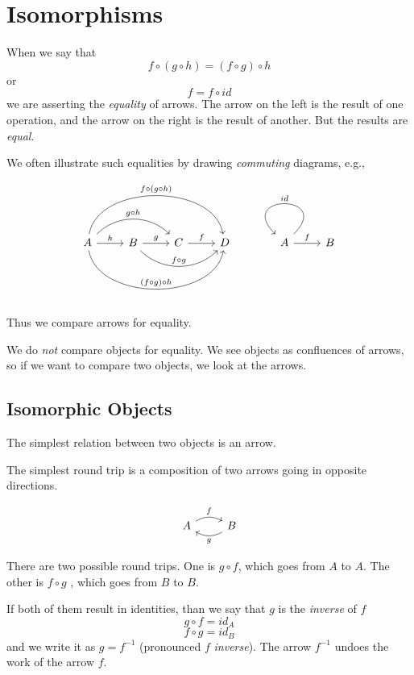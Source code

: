 \documentclass[DaoFP]{subfiles}
\begin{document}
\setcounter{chapter}{2}


\chapter{Isomorphisms}

When we say that 
\[f \circ (g \circ h) = (f \circ g) \circ h \]
or
\[ f = f \circ id \]
we are asserting the \emph{equality} of arrows. The arrow on the left is the result of one operation, and the arrow on the right is the result of another. But the results are \emph{equal}.

We often illustrate such equalities by drawing \emph{commuting} diagrams, e.g.,

\[
 \begin{tikzcd}
 A
 \arrow[r, "h"]
 \arrow[rr, bend left=45, "g \circ h"]
 \arrow[rrr, bend left=80, "f \circ (g \circ h)"]
 \arrow[rrr, bend right=80, "(f \circ g) \circ h"]
 & B
 \arrow[r, "g"]
 \arrow[rr, bend right=45, "f \circ g"]
 &C
 \arrow[r, "f"]
 &D
 \end{tikzcd}
 \begin{tikzcd}
 A
 \arrow[r, "f"]
 \arrow[r, loop, "id"']
 &B
 \end{tikzcd}
\]

Thus we compare arrows for equality.

We do \emph{not} compare objects for equality. We see objects as confluences of arrows, so if we want to compare two objects, we look at the arrows.

\section{Isomorphic Objects}

The simplest relation between two objects is an arrow.

The simplest round trip is a composition of two arrows going in opposite directions. 

\[
 \begin{tikzcd}
 A
 \arrow[r, bend left, "f"]
 & B
 \arrow[l, bend left, "g"]
 \end{tikzcd}
\]

There are two possible round trips. One is $g \circ f$, which goes from $A$ to $A$. The other is $f \circ g$ , which goes from $B$ to $B$.

If both of them result in identities, than we say that $g$ is the \emph{inverse} of $f$
\[ g \circ f = id_A\]
\[f \circ g = id_B\]
and we write it as $g = f^{-1}$ (pronounced $f$ \emph{inverse}). The arrow $ f^{-1}$ undoes the work of the arrow $f$. 
\end{document}
